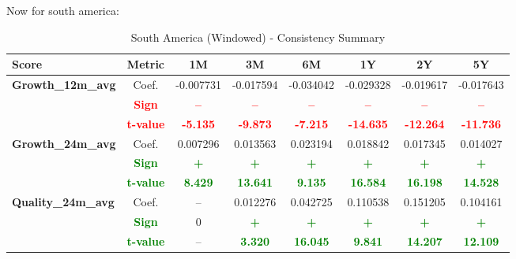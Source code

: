 \documentclass[11pt,english,a4paper,hidelinks]{book}
\begin{document}
\noindent Now for south america:
\begin{table}[H]
    \centering
    \caption{South America (Windowed) - Consistency Summary}
    \begin{tabular}{lccccccc}
        \toprule
        \textbf{Score} & \textbf{Metric} & \textbf{1M} & \textbf{3M} & \textbf{6M} & \textbf{1Y} & \textbf{2Y} & \textbf{5Y} \\
        \midrule
        \multirow{3}{*}{\textbf{Growth\_12m\_avg}}
            & Coef.   & -0.007731 & -0.017594 & -0.034042 & -0.029328 & -0.019617 & -0.017643 \\
            & \textbf{\textcolor{red}{Sign}}    & \textbf{\textcolor{red}{–}} & \textbf{\textcolor{red}{–}} & \textbf{\textcolor{red}{–}} & \textbf{\textcolor{red}{–}} & \textbf{\textcolor{red}{–}} & \textbf{\textcolor{red}{–}} \\
            & \textbf{\textcolor{red}{t-value}} & \textbf{\textcolor{red}{-5.135}} & \textbf{\textcolor{red}{-9.873}} & \textbf{\textcolor{red}{-7.215}} & \textbf{\textcolor{red}{-14.635}} & \textbf{\textcolor{red}{-12.264}} & \textbf{\textcolor{red}{-11.736}} \\
        \multirow{3}{*}{\textbf{Growth\_24m\_avg}}
            & Coef.   & 0.007296 & 0.013563 & 0.023194 & 0.018842 & 0.017345 & 0.014027 \\
            & \textbf{\textcolor{green}{Sign}}    & \textbf{\textcolor{green}{+}} & \textbf{\textcolor{green}{+}} & \textbf{\textcolor{green}{+}} & \textbf{\textcolor{green}{+}} & \textbf{\textcolor{green}{+}} & \textbf{\textcolor{green}{+}} \\
            & \textbf{\textcolor{green}{t-value}} & \textbf{\textcolor{green}{8.429}} & \textbf{\textcolor{green}{13.641}} & \textbf{\textcolor{green}{9.135}} & \textbf{\textcolor{green}{16.584}} & \textbf{\textcolor{green}{16.198}} & \textbf{\textcolor{green}{14.528}} \\
        \midrule
        \multirow{3}{*}{\textbf{Quality\_24m\_avg}}
            & Coef.   & -- & 0.012276 & 0.042725 & 0.110538 & 0.151205 & 0.104161 \\
            & \textbf{\textcolor{green}{Sign}}    & 0 & \textbf{\textcolor{green}{+}} & \textbf{\textcolor{green}{+}} & \textbf{\textcolor{green}{+}} & \textbf{\textcolor{green}{+}} & \textbf{\textcolor{green}{+}} \\
            & \textbf{\textcolor{green}{t-value}} & -- & \textbf{\textcolor{green}{3.320}} & \textbf{\textcolor{green}{16.045}} & \textbf{\textcolor{green}{9.841}} & \textbf{\textcolor{green}{14.207}} & \textbf{\textcolor{green}{12.109}} \\

\end{tabular}
\end{table}
\end{document}
